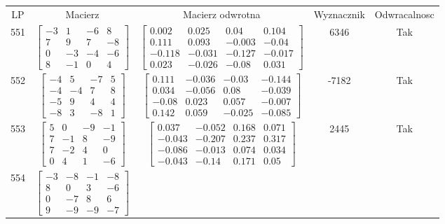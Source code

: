 \documentclass[a4paper,12pt]{article}
\begin{document}
\bgroup {} \vspace{0.2in} \begin{tabular}{c c c c c}
LP & Macierz & Macierz odwrotna & Wyznacznik & Odwracalnosc\\
551
&
$\begin{bmatrix} -3 & 1 & -6 & 8 \\ 7 & 9 & 7 & -8 \\ 0 & -3 & -4 & -6 \\ 8 & -1 & 0 & 4 \end{bmatrix}$
&
$\begin{bmatrix} 0.002 & 0.025 & 0.04 & 0.104 \\ 0.111 & 0.093 & -0.003 & -0.04 \\ -0.118 & -0.031 & -0.127 & -0.017 \\ 0.023 & -0.026 & -0.08 & 0.031 \end{bmatrix}$
&
6346
&
Tak
\\
552
&
$\begin{bmatrix} -4 & 5 & -7 & 5 \\ -4 & -4 & 7 & 8 \\ -5 & 9 & 4 & 4 \\ -8 & 3 & -8 & 1 \end{bmatrix}$
&
$\begin{bmatrix} 0.111 & -0.036 & -0.03 & -0.144 \\ 0.034 & -0.056 & 0.08 & -0.039 \\ -0.08 & 0.023 & 0.057 & -0.007 \\ 0.142 & 0.059 & -0.025 & -0.085 \end{bmatrix}$
&
-7182
&
Tak
\\
553
&
$\begin{bmatrix} 5 & 0 & -9 & -1 \\ 7 & -1 & 8 & -9 \\ 7 & -2 & 4 & 0 \\ 0 & 4 & 1 & -6 \end{bmatrix}$
&
$\begin{bmatrix} 0.037 & -0.052 & 0.168 & 0.071 \\ -0.043 & -0.207 & 0.237 & 0.317 \\ -0.086 & -0.013 & 0.074 & 0.034 \\ -0.043 & -0.14 & 0.171 & 0.05 \end{bmatrix}$
&
2445
&
Tak
\\
554
&
$\begin{bmatrix} -3 & -8 & -1 & -8 \\ 8 & 0 & 3 & -6 \\ 0 & -7 & 8 & 6 \\ 9 & -9 & -9 & -7 \end{bmatrix}$

\end{tabular}
\end{document}
